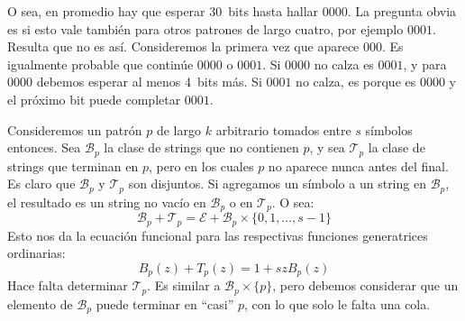   O sea,
  en promedio hay que esperar \(30\)~bits hasta hallar \(0000\).
  La pregunta obvia es si esto vale también para otros patrones
  de largo cuatro,
  por ejemplo \(0001\).
  Resulta que no es así.
  Consideremos la primera vez que aparece \(000\).
  Es igualmente probable que continúe \(0000\) o \(0001\).
  Si \(0000\) no calza es \(0001\),
  y para \(0000\) debemos esperar al menos \(4\)~bits más.
  Si \(0001\) no calza,
  es porque es \(0000\) y el próximo bit puede completar \(0001\).

  Consideremos un patrón \(p\) de largo \(k\) arbitrario
  tomados entre \(s\) símbolos entonces.
  Sea \(\mathcal{B}_p\)
  la clase de \foreignlanguage{english}{strings}
  que no contienen \(p\),
  y sea \(\mathcal{T}_p\)
  la clase de \foreignlanguage{english}{strings}
  que terminan en \(p\),
  pero en los cuales \(p\) no aparece nunca antes del final.
  Es claro que \(\mathcal{B}_p\) y \(\mathcal{T}_p\) son disjuntos.
  Si agregamos un símbolo a un \foreignlanguage{english}{string}
  en \(\mathcal{B}_p\),
  el resultado es un \foreignlanguage{english}{string} no vacío
  en \(\mathcal{B}_p\) o en \(\mathcal{T}_p\).
  O sea:%
  \begin{equation*}
    \mathcal{B}_p + \mathcal{T}_p
      = \mathcal{E} + \mathcal{B}_p \times \{ 0, 1, \dotsc, s - 1 \}
  \end{equation*}
  Esto nos da la ecuación funcional
  para las respectivas funciones generatrices ordinarias:%
  \begin{equation}
    \label{eq:B+T-fe}
    B_p(z) + T_p(z)
      = 1 + s z B_p(z)
  \end{equation}
  Hace falta determinar \(\mathcal{T}_p\).
  Es similar a \(\mathcal{B}_p \times \{ p \}\),
  pero debemos considerar que un elemento de \(\mathcal{B}_p\)
  puede terminar en ``casi'' \(p\),
  con lo que solo le falta una cola.

